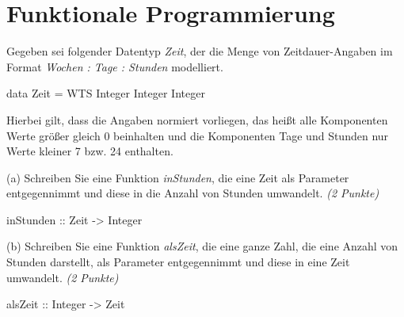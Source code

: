 \documentclass[11pt,a4paper,oneside,ngerman]{scrbook}
\begin{document}
\section{Funktionale Programmierung}
Gegeben sei folgender Datentyp \emph{Zeit}, der die Menge von Zeitdauer-Angaben im Format \emph{Wochen : Tage : Stunden} modelliert.
\begin{code}
  data Zeit = WTS Integer Integer Integer
\end{code}
Hierbei gilt, dass die Angaben normiert vorliegen, das heißt alle Komponenten Werte größer gleich 0 beinhalten und die Komponenten Tage und Stunden nur Werte kleiner 7 bzw. 24 enthalten.

(a) Schreiben Sie eine Funktion \emph{inStunden}, die eine Zeit als Parameter entgegennimmt und diese in die Anzahl von Stunden umwandelt. \emph{(2 Punkte)}

\begin{code}
  inStunden :: Zeit -> Integer






\end{code}

(b) Schreiben Sie eine Funktion \emph{alsZeit}, die eine ganze Zahl, die eine Anzahl von Stunden darstellt, als Parameter entgegennimmt und diese in eine Zeit umwandelt. \emph{(2 Punkte)}

\begin{code}
  alsZeit :: Integer -> Zeit
\end{code}
\end{document}
